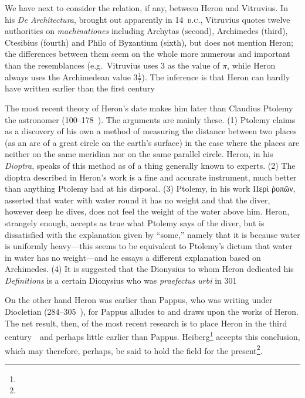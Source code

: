 We have next to consider the relation, if any, between Heron and Vitruvius. In his \emph{De Architectura}, brought out apparently in 14~\textsc{b.c.}, Vitruvius quotes twelve authorities on \emph{machinationes} including Archytas (second), Archimedes (third), Ctesibius (fourth) and Philo of Byzantium (sixth), but does not mention Heron; the differences between them seem on the whole more numerous and important than the resemblances (e.g.\ Vitruvius uses 3 as the value of \(\pi\), while Heron always uses the Archimedean value \(3\frac{1}{7}\)). The inference is that Heron can hardly have written earlier than the first century~\ad

The most recent theory of Heron's date makes him later than Claudius Ptolemy the astronomer (100--178~\ad). The arguments are mainly these. (1) Ptolemy claims as a discovery of his own a method of measuring the distance between two places (as an arc of a great circle on the earth's surface) in the case where the places are neither on the same meridian nor on the same parallel circle. Heron, in his \emph{Dioptra}, speaks of this method as of a thing generally known to experts. (2) The dioptra described in Heron's work is a fine and accurate instrument, much better than anything Ptolemy had at his disposal. (3) Ptolemy, in his work Περὶ ῥοπῶν, asserted that water with water round it has no weight and that the diver, however deep he dives, does not feel the weight of the water above him. Heron, strangely enough, accepts as true what Ptolemy says of the diver, but is dissatisfied with the explanation given by ``some,'' namely that it is because water is uniformly heavy---this seems to be equivalent to Ptolemy's dictum that water in water has no weight---and he essays a different explanation based on Archimedes. (4) It is suggested that the Dionysius to whom Heron dedicated his \emph{Definitions} is a certain Dionysius who was \emph{praefectus urbi} in 301~\ad

On the other hand Heron was earlier than Pappus, who was writing under Diocletian (284--305~\ad), for Pappus alludes to and draws upon the works of Heron. The net result, then, of the most recent research is to place Heron in the third century~\ad\ and perhaps little earlier than Pappus. Heiberg\footnote{} accepts this conclusion, which may therefore, perhaps, be said to hold the field for the present\footnote{}.


